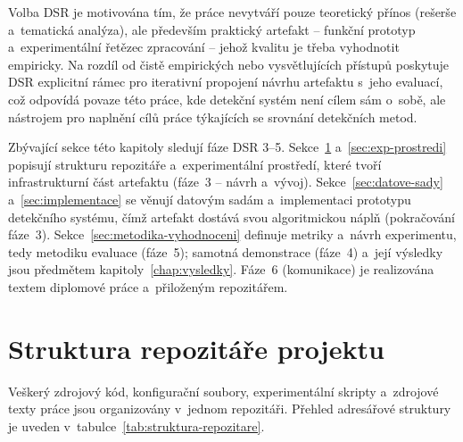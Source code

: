 Volba DSR je motivována tím, že práce nevytváří pouze teoretický přínos (rešerše a~tematická analýza), ale především praktický artefakt -- funkční prototyp a~experimentální řetězec zpracování -- jehož kvalitu je třeba vyhodnotit empiricky. Na rozdíl od čistě empirických nebo vysvětlujících přístupů poskytuje DSR explicitní rámec pro iterativní propojení návrhu artefaktu s~jeho evaluací, což odpovídá povaze této práce, kde detekční systém není cílem sám o~sobě, ale nástrojem pro naplnění cílů práce týkajících se srovnání detekčních metod.

Zbývající sekce této kapitoly sledují fáze DSR 3--5. Sekce~\ref{sec:struktura-repo} a~\ref{sec:exp-prostredi} popisují strukturu repozitáře a~experimentální prostředí, které tvoří infrastrukturní část artefaktu (fáze~3 -- návrh a~vývoj). Sekce~\ref{sec:datove-sady} a~\ref{sec:implementace} se věnují datovým sadám a~implementaci prototypu detekčního systému, čímž artefakt dostává svou algoritmickou náplň (pokračování fáze~3). Sekce~\ref{sec:metodika-vyhodnoceni} definuje metriky a~návrh experimentu, tedy metodiku evaluace (fáze~5); samotná demonstrace (fáze~4) a~její výsledky jsou předmětem kapitoly~\ref{chap:vysledky}. Fáze~6 (komunikace) je realizována textem diplomové práce a~přiloženým repozitářem.

\section{Struktura repozitáře projektu}
\label{sec:struktura-repo}

Veškerý zdrojový kód, konfigurační soubory, experimentální skripty a~zdrojové texty práce jsou organizovány v~jednom repozitáři. Přehled adresářové struktury je uveden v~tabulce~\ref{tab:struktura-repozitare}.

